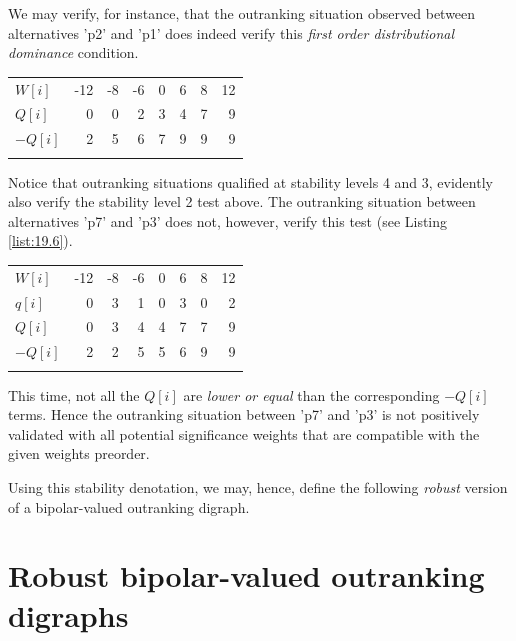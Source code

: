 We may verify, for instance, that the outranking situation observed between alternatives 'p2' and 'p1' does indeed verify this \emph{first order distributional dominance} condition. \hfill
\begin{center}
\begin{tabular}{l|r|r|r|r|r|r|r}
 \hline\noalign{\smallskip}
  $W[i]$ & -12 & -8  & -6  &  0  &  6  &  8 &  12\\  
 \noalign{\smallskip}\hline\noalign{\smallskip}
  $Q[i]$  &  0 &  0 &   2 &   3  &  4  &  7  &  9 \\
  $-Q[i]$  &  2 &  5 &   6 &   7  &  9  &  9  &  9 \\
 \noalign{\smallskip}\hline
\end{tabular}
\end{center}

Notice that outranking situations qualified at stability levels 4 and 3, evidently also verify the stability level 2 test above. The outranking situation between alternatives 'p7' and 'p3' does not, however, verify this test (see Listing \ref{list:19.6}).\hfill
\begin{center}
\begin{tabular}{l|r|r|r|r|r|r|r}
 \hline\noalign{\smallskip}
  $W[i]$ & -12 & -8  & -6  &  0  &  6  &  8 &  12\\  
 \noalign{\smallskip}\hline\noalign{\smallskip}
  $q[i]$  &  0 &  3 &   1 &   0  &  3  &  0  &  2 \\
  $Q[i]$  &  0 &  3 &   4 &   4  &  7  &  7  &  9 \\
  $-Q[i]$  &  2 &  2 &   5 &   5  &  6  &  9  &  9 \\
 \noalign{\smallskip}\hline
\end{tabular}
\end{center}

\noindent This time, not all the $Q[i]$ are \emph{lower or equal} than the corresponding $-Q[i]$ terms. Hence the outranking situation between 'p7' and 'p3' is not positively validated with all potential significance weights that are compatible with the given weights preorder.

Using this stability denotation, we may, hence, define the following \emph{robust} version of a bipolar-valued outranking digraph.

\section{Robust bipolar-valued outranking digraphs}
\label{sec:19.4}

